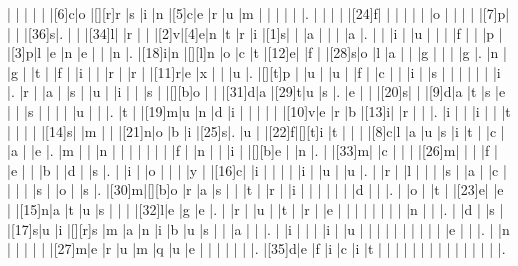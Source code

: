 \documentclass[12pt]{article}
\begin{document}
\begin{Puzzle}{22}{24}
  |{}  |{}  |{}  |{}  |{}  |[6]c|o   |[][r]r   |s   |i   |n   |[5]c|e   |r   |u   |m   |{}  |{}  |{}  |{}  |{}  |.
  |{}  |{}  |{}  |{}  |[24]f|{}  |{}  |{}  |{}  |{}  |{}  |o   |{}  |{}  |{}  |{}  |[7]p|{}  |{}  |{}  |[36]s|.
  |{}  |{}  |[34]l|{}  |r   |{}  |{}  |[2]v|[4]e|n   |t   |r   |i   |[1]s|{}  |{}  |a   |{}  |{}  |{}  |a   |.
  |{}  |{}  |i   |{}  |u   |{}  |{}  |{}  |f   |{}  |{}  |p   |{}  |[3]p|l   |e   |n   |e   |{}  |{}  |n   |.
  |[18]i|n   |[][l]n   |o   |c   |t   |[12]e|{}  |f   |{}  |[28]s|o   |l   |a   |{}  |{}  |g   |{}  |{}  |{}  |g   |.
  |n   |{}  |g   |{}  |t   |{}  |f   |{}  |i   |{}  |{}  |r   |{}  |r   |{}  |[11]r|e   |x   |{}  |{}  |u   |.
  |[][t]p   |{}  |u   |{}  |u   |{}  |f   |{}  |c   |{}  |{}  |i   |{}  |s   |{}  |{}  |{}  |{}  |{}  |{}  |i   |.
  |r   |{}  |a   |{}  |s   |{}  |u   |{}  |i   |{}  |{}  |s   |{}  |[][b]o   |{}  |{}  |[31]d|a   |[29]t|u   |s   |.
  |e   |{}  |{}  |[20]s|{}  |{}  |[9]d|a   |t   |s   |e   |{}  |{}  |s   |{}  |{}  |{}  |{}  |u   |{}  |{}  |.
  |t   |{}  |[19]m|u   |n   |d   |i   |{}  |{}  |{}  |{}  |{}  |[10]v|e   |r   |b   |[13]i|{}  |r   |{}  |{}  |.
  |i   |{}  |{}  |i   |{}  |{}  |t   |{}  |{}  |{}  |{}  |[14]s|{}  |m   |{}  |{}  |[21]n|o   |b   |i   |[25]s|.
  |u   |{}  |[22]f|[][t]i   |t   |{}  |{}  |{}  |[8]c|l   |a   |u   |s   |i   |t   |{}  |c   |{}  |a   |{}  |e   |.
  |m   |{}  |{}  |n   |{}  |{}  |{}  |{}  |{}  |{}  |{}  |f   |{}  |n   |{}  |{}  |i   |{}  |[][b]e   |{}  |n   |.
  |{}  |[33]m|{}  |c   |{}  |{}  |{}  |[26]m|{}  |{}  |{}  |f   |{}  |e   |{}  |{}  |b   |{}  |d   |{}  |s   |.
  |{}  |i   |{}  |o   |{}  |{}  |{}  |y   |{}  |[16]c|{}  |i   |{}  |{}  |{}  |{}  |i   |{}  |u   |{}  |u   |.
  |{}  |r   |{}  |l   |{}  |{}  |{}  |s   |{}  |a   |{}  |c   |{}  |{}  |{}  |{}  |s   |{}  |o   |{}  |s   |.
  |[30]m|[][b]o   |r   |a   |s   |{}  |{}  |t   |{}  |r   |{}  |i   |{}  |{}  |{}  |{}  |{}  |{}  |d   |{}  |{}  |.
  |{}  |o   |{}  |t   |{}  |[23]e|{}  |e   |{}  |[15]n|a   |t   |u   |s   |{}  |{}  |{}  |[32]l|e   |g   |e   |.
  |{}  |r   |{}  |u   |{}  |t   |{}  |r   |{}  |e   |{}  |{}  |{}  |{}  |{}  |{}  |{}  |{}  |n   |{}  |{}  |.
  |{}  |d   |{}  |s   |{}  |[17]s|u   |i   |[][r]s   |m   |a   |n   |i   |b   |u   |s   |{}  |{}  |a   |{}  |{}  |.
  |{}  |i   |{}  |{}  |{}  |i   |{}  |u   |{}  |{}  |{}  |{}  |{}  |{}  |{}  |{}  |{}  |{}  |e   |{}  |{}  |.
  |{}  |n   |{}  |{}  |{}  |{}  |{}  |[27]m|e   |r   |u   |m   |q   |u   |e   |{}  |{}  |{}  |{}  |{}  |{}  |.
  |[35]d|e   |f   |i   |c   |i   |t   |{}  |{}  |{}  |{}  |{}  |{}  |{}  |{}  |{}  |{}  |{}  |{}  |{}  |{}  |.
\end{Puzzle}
\end{document}
